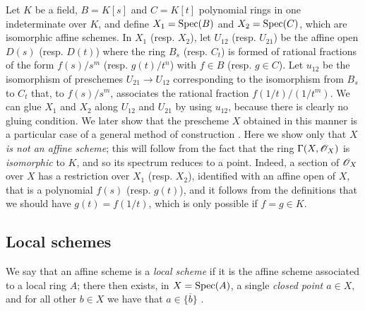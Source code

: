 \begin{example}[2.3.2]
\label{I.2.3.2}
Let $K$ be a field, $B=K[s]$ and $C=K[t]$ polynomial rings in one indeterminate over $K$, and define $X_1=\operatorname{Spec}(B)$ and $X_2=\operatorname{Spec}(C)$, which are isomorphic affine schemes.
In $X_1$ (resp. $X_2$), let $U_{12}$ (resp. $U_{21}$) be the affine open $D(s)$ (resp. $D(t)$) where the ring $B_s$ (resp. $C_t$) is formed of rational fractions of the form $f(s)/s^m$ (resp. $g(t)/t^n$) with $f\in B$ (resp. $g\in C$).
Let $u_{12}$ be the isomorphism of preschemes $U_{21}\to U_{12}$ corresponding  to the isomorphism from $B_s$ to $C_t$ that, to $f(s)/s^m$, associates the rational fraction $f(1/t)/(1/t^m)$.
We can glue $X_1$ and $X_2$ along $U_{12}$ and $U_{21}$ by using $u_{12}$, because there is clearly no gluing condition.
We later show that the prescheme $X$ obtained in this manner is a particular case of a general method of construction .
Here we show only that $X$ \emph{is not an affine scheme};
this will follow from the fact that the ring $\Gamma(X,\mathscr{O}_X)$ is \emph{isomorphic} to $K$, and so its spectrum reduces to a point.
Indeed, a section of $\mathscr{O}_X$ over $X$ has a restriction over $X_1$ (resp. $X_2$), identified with an affine open of $X$, that is a polynomial $f(s)$ (resp. $g(t)$), and it follows from the definitions that we should have $g(t)=f(1/t)$, which is only possible if $f=g\in K$.
\end{example}

\subsection{Local schemes}
\label{subsection:I.2.4}

\begin{env}[2.4.1]
\label{I.2.4.1}
We say that an affine scheme is a \emph{local scheme} if it is the affine scheme associated to a local ring $A$;
there then exists, in $X=\operatorname{Spec}(A)$, a single \emph{closed point $a\in X$}, and for all other $b\in X$ we have that $a\in\overline{\{b\}}$ .
\end{env}

